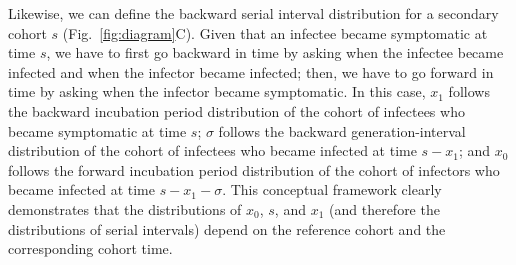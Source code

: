 \documentclass[12pt]{article}
\newcommand{\fref}[1]{Fig.~\ref{fig:#1}}
\newcommand{\st}{s} %
\newcommand{\gtime}{\sigma} %
\begin{document}
Likewise, we can define the backward serial interval distribution for a secondary cohort $\st$ (\fref{diagram}C).
Given that an infectee became symptomatic at time $\st$, we have to first go backward in time by asking when the infectee became infected and when the infector became infected; 
then, we have to go forward in time by asking when the infector became symptomatic.
In this case, $x_1$ follows the backward incubation period distribution of the cohort of infectees who became symptomatic at time $\st$;
$\gtime$ follows the backward generation-interval distribution of the cohort of infectees who became infected at time $\st-x_1$;
and $x_0$ follows the forward incubation period distribution of the cohort of infectors who became infected at time $\st-x_1-\gtime$.
This conceptual framework clearly demonstrates that the distributions of $x_0$, $\st$, and $x_1$ (and therefore the distributions of serial intervals) depend on the reference cohort and the corresponding cohort time.
\end{document}
